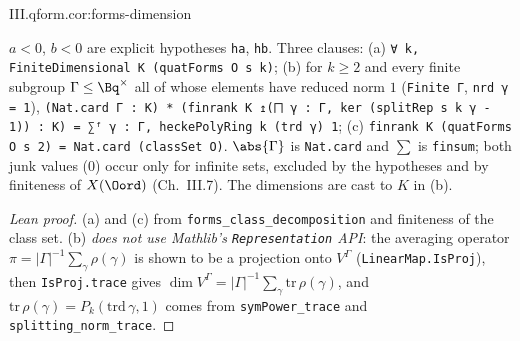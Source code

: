 \begin{tfformal}{III.qform.cor:forms-dimension}
\begin{tffidelity}
$a<0$, $b<0$ are explicit hypotheses \texttt{ha}, \texttt{hb}. Three clauses: (a) \texttt{∀ k, FiniteDimensional K (quatForms O s k)}; (b) for $k\ge2$ and every finite subgroup $\Gamma\le\Bq^\times$ all of whose elements have reduced norm $1$ (\texttt{Finite Γ}, \texttt{nrd γ = 1}), \texttt{(Nat.card Γ : K) * (finrank K ↥(⨅ γ : Γ, ker (splitRep s k γ - 1)) : K) = ∑ᶠ γ : Γ, heckePolyRing k (trd γ) 1}; (c) \texttt{finrank K (quatForms O s 2) = Nat.card (classSet O)}. $\abs{\Gamma}$ is \texttt{Nat.card} and $\sum$ is \texttt{finsum}; both junk values ($0$) occur only for infinite sets, excluded by the hypotheses and by finiteness of $X(\Oord)$ (Ch.~III.7). The dimensions are cast to $K$ in (b).
\end{tffidelity}
\end{tfformal}
\begin{proof}[Lean proof]
(a) and (c) from \texttt{forms\_class\_decomposition} and finiteness of the class set. (b) \emph{does not use Mathlib's \texttt{Representation} API}: the averaging operator $\pi=|\Gamma|^{-1}\sum_\gamma\rho(\gamma)$ is shown to be a projection onto $V^\Gamma$ (\texttt{LinearMap.IsProj}), then \texttt{IsProj.trace} gives $\dim V^\Gamma=|\Gamma|^{-1}\sum_\gamma\mathrm{tr}\,\rho(\gamma)$, and $\mathrm{tr}\,\rho(\gamma)=P_k(\mathrm{trd}\,\gamma,1)$ comes from \texttt{symPower\_trace} and \texttt{splitting\_norm\_trace}.
\end{proof}


